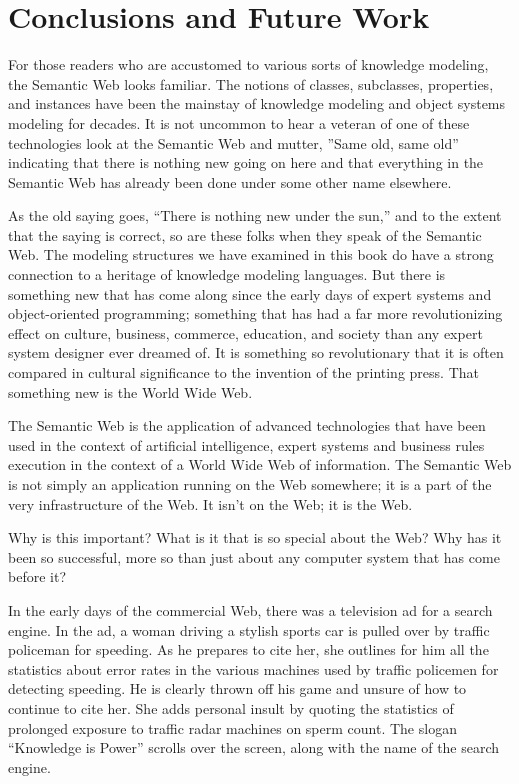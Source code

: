 \chapter{Conclusions and Future Work}
\label{ch17}



For those readers who are accustomed to various sorts of knowledge
modeling, the Semantic Web looks familiar. The notions of classes,
subclasses, properties, and instances have been the mainstay of
knowledge modeling and object systems modeling for decades. It is not
uncommon to hear a veteran of one of these technologies look at the
Semantic Web and mutter, ''Same old, same old'' indicating that there
is nothing new going on here and that everything in the Semantic Web has
already been done under some other name elsewhere.

As the old saying goes, ``There is nothing new under the sun,'' and to
the extent that the saying is correct, so are these folks when they
speak of the Semantic Web. The modeling structures we have examined in
this book do have a strong connection to a heritage of knowledge
modeling languages. But there is something new that has come along since
the early days of expert systems and object-oriented programming;
something that has had a far more revolutionizing effect on culture,
business, commerce, education, and society than any expert system
designer ever dreamed of. It is something so revolutionary that it is
often compared in cultural significance to the invention of the printing
press. That something new is the World Wide Web.

The Semantic Web is the application of advanced technologies that have
been used in the context of artificial intelligence, expert systems and
business rules execution in the context of a World Wide Web of
information. The Semantic Web is not simply an application running on
the Web somewhere; it is a part of the very infrastructure of the Web.
It isn't on the Web; it is the Web.

Why is this important? What is it that is so special about the Web? Why
has it been so successful, more so than just about any computer system
that has come before it?

In the early days of the commercial Web, there was a television ad for a
search engine. In the ad, a woman driving a stylish sports car is pulled
over by traffic policeman for speeding. As he prepares to cite her, she
outlines for him all the statistics about error rates in the various
machines used by traffic policemen for detecting speeding. He is clearly
thrown off his game and unsure of how to continue to cite her. She adds
personal insult by quoting the statistics of prolonged exposure to
traffic radar machines on sperm count. The slogan ``Knowledge is Power''
scrolls over the screen, along with the name of the search engine.


